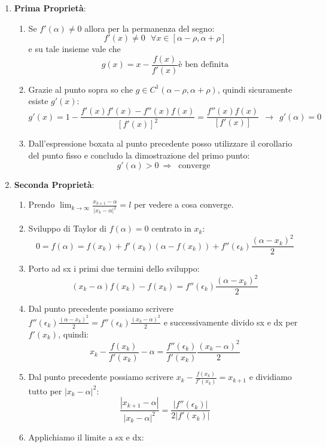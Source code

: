 \documentclass{article}
\begin{document}
\begin{enumerate}
    \item \textbf{Prima Proprietà}:
    \begin{enumerate}
        \item Se $f'(\alpha) \neq 0$ allora per la permanenza del segno:
        \[ f'(x) \neq 0 \:\:\: \forall x \in [\alpha - \rho, \alpha + \rho] \]
        e su tale insieme vale che
        \[ g(x) = x - \frac{f(x)}{f'(x)} \text{è ben definita}\]
        \item Grazie al punto sopra so che $g \in C^{1}(\alpha - \rho, \alpha + \rho)$, quindi sicuramente esiste $g'(x)$:
        \[ g'(x) = 1 - \frac{f'(x)f'(x) - f''(x)f(x)}{[f'(x)]^{2}} = \frac{f''(x)f(x)}{[f'(x)]} \:\: \rightarrow \:\: \boxed{g'(\alpha) = 0} \]
        \item Dall'espressione boxata al punto precedente posso utilizzare il corollario del punto fisso e concludo la dimostrazione del primo punto:
        \[ g'(\alpha) > 0 \: \Rightarrow \: \text{ converge } \]
    \end{enumerate}
    \item \textbf{Seconda Proprietà}:
    \begin{enumerate}
        \item Prendo $\lim_{k \rightarrow \infty} \frac{x_{k+1} - \alpha}{|x_{k} - \alpha |^{2}} = l$ per vedere a cosa converge.
        \item Sviluppo di Taylor di $f(\alpha) = 0$ centrato in $x_{k}$:
        \[ 0 = f(\alpha) = f(x_{k}) + f'(x_{k})(\alpha - f(x_{k})) + f''(\epsilon_{k})\frac{(\alpha - x_{k})^{2}}{2}  \]
        \item Porto ad sx i primi due termini dello sviluppo:
        \[ (x_{k} - \alpha)f(x_{k}) - f(x_{k}) = f''(\epsilon_{k})\frac{(\alpha - x_{k})^{2}}{2} \]
        \item Dal punto precedente possiamo scrivere $f''(\epsilon_{k})\frac{(\alpha - x_{k})^{2}}{2} = f''(\epsilon_{k})\frac{(x_{k} - \alpha)^{2}}{2}$ e successivamente divido sx e dx per $f'(x_{k})$, quindi:
        \[ x_{k} - \frac{f(x_{k})}{f'(x_{k})} - \alpha = \frac{f''(\epsilon_{k})}{f'(x_{k})} \frac{(x_{k} - \alpha)^{2}}{2} \]
        \item Dal punto precedente possiamo scrivere $x_{k} - \frac{f(x_{k})}{f'(x_{k})} = x_{k+1}$ e dividiamo tutto per $|x_{k} - \alpha|^{2}$:
        \[ \frac{|x_{k+1} - \alpha|}{|x_{k} - \alpha|^{2}} = \frac{|f''(\epsilon_{k})|}{2|f'(x_{k})|} \]
\newpage
        \item Applichiamo il limite a sx e dx:

\end{enumerate}
\end{enumerate}
\end{document}

